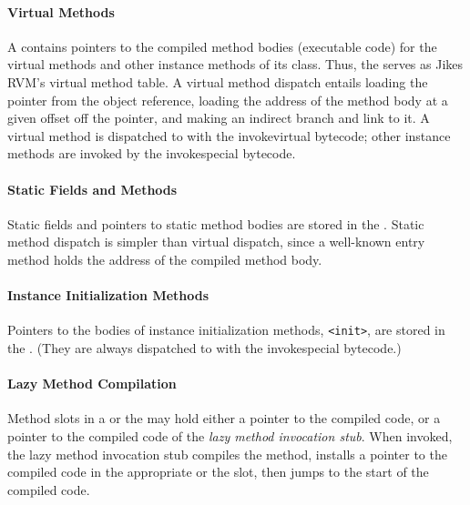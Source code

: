 \paragraph{Virtual Methods}%
%
A  contains pointers to the compiled method 
bodies (executable code) for the virtual methods and other instance
methods of its class. 
Thus, the  serves as Jikes RVM's virtual method table.
A virtual method dispatch entails loading the  pointer from 
the object reference, loading the address of the method
body at a given offset off the  pointer, and making an indirect
branch and link to it.  A virtual method is dispatched to with the
{\instruction invokevirtual} bytecode; other instance methods are
invoked by the {\instruction invokespecial} bytecode.

\paragraph{Static Fields and Methods}%
Static fields and pointers to static method bodies are stored in the . 
Static method dispatch is simpler than virtual dispatch, since 
a well-known  entry method holds the address of the
compiled method body.  

\paragraph{Instance Initialization Methods}%
Pointers to the bodies of instance initialization
methods, \texttt{<init>}, are stored in the .
(They are always dispatched to with the {\instruction invokespecial} bytecode.)

\paragraph{Lazy Method Compilation}\label{par:lazy}%
%
%
Method slots in a  or the  may hold either
a pointer to the compiled code, 
or a pointer to the compiled code of the {\em lazy method invocation stub}.
When invoked, the lazy method invocation stub compiles the 
method, installs a pointer to the compiled code in the appropriate
 or the  slot, then 
jumps to the start of the compiled code. 

